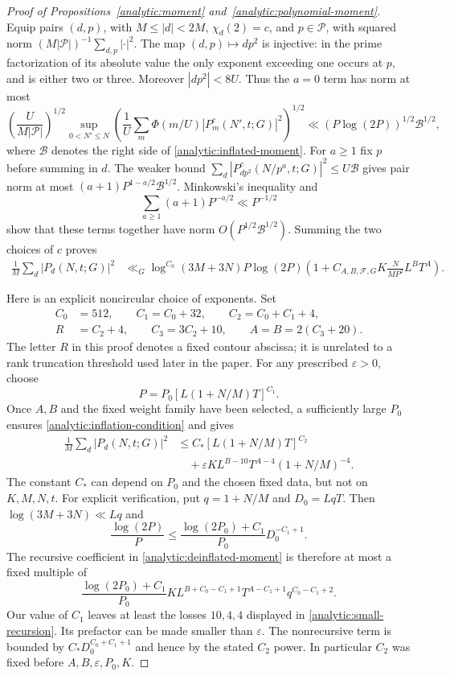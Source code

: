 \begin{proof}[Proof of Propositions~\ref{analytic:moment} and~\ref{analytic:polynomial-moment}]
Equip pairs $(d,p)$, with $M\leq|d|<2M$, $\chi_d(2)=c$, and
$p\in\mathcal P$, with squared norm
$(M|\mathcal P|)^{-1}\sum_{d,p}|\cdot|^2$.
The map $(d,p)\mapsto dp^2$ is injective: in the prime factorization
of its absolute value the only exponent exceeding one occurs at
$p$, and is either two or three. Moreover $|dp^2|<8U$.
Thus the $a=0$ term has norm at most
\[
 \left(\frac{U}{M|\mathcal P|}\right)^{1/2}
 \sup_{0<N'\leq N}
 \left(\frac1U\sum_m\Phi(m/U)|P_m^c(N',t;G)|^2\right)^{1/2}
 \ll(P\log(2P))^{1/2}\mathcal B^{1/2},
\]
where $\mathcal B$ denotes the right side of
\eqref{analytic:inflated-moment}.
For $a\geq1$ fix $p$ before summing in $d$. The weaker bound
$\sum_d|P_{dp^2}^c(N/p^a,t;G)|^2\leq U\mathcal B$ gives pair norm
at most
$(a+1)P^{1-a/2}\mathcal B^{1/2}$. Minkowski's inequality and
\[
 \sum_{a\geq1}(a+1)P^{-a/2}\ll P^{-1/2}
\]
show that these terms together have norm
$O(P^{1/2}\mathcal B^{1/2})$. Summing the two choices of $c$ proves
\begin{align}
 \frac1M\sum_d|P_d(N,t;G)|^2
 &\ll_G\log^{C_0}(3M+3N)P\log(2P)
 \left(1+C_{A,B,\mathcal F,G}K\frac{N}{MP^2}L^BT^A\right).
 \label{analytic:deinflated-moment}
\end{align}

Here is an explicit noncircular choice of exponents. Set
\begin{equation}\label{analytic:exponent-choices}
 \begin{split}
 C_0&=512,\qquad C_1=C_0+32,\qquad C_2=C_0+C_1+4,\\
 R&=C_2+4,\qquad C_3=3C_2+10,\qquad
 A=B=2(C_3+20).
 \end{split}
\end{equation}
The letter $R$ in this proof denotes a fixed contour abscissa; it is
unrelated to a rank truncation threshold used later in the paper.
For any prescribed $\varepsilon>0$, choose
\begin{equation}\label{analytic:choice-P}
 P=P_0[L(1+N/M)T]^{C_1}.
\end{equation}
Once $A,B$ and the fixed weight family have been selected, a sufficiently
large $P_0$ ensures \eqref{analytic:inflation-condition} and gives
\begin{align}
 \frac1M\sum_d|P_d(N,t;G)|^2
 &\leq C_*[L(1+N/M)T]^{C_2}
 \nonumber\\
 &\quad+\varepsilon K L^{B-10}T^{A-4}(1+N/M)^{-4}.
 \label{analytic:small-recursion}
\end{align}
The constant $C_*$ can depend on $P_0$ and the chosen fixed data, but
not on $K,M,N,t$.
For explicit verification, put $q=1+N/M$ and $D_0=LqT$.
Then $\log(3M+3N)\ll Lq$ and
\[
 \frac{\log(2P)}P
 \leq\frac{\log(2P_0)+C_1}{P_0}D_0^{-C_1+1}.
\]
The recursive coefficient in \eqref{analytic:deinflated-moment} is
therefore at most a fixed multiple of
\[
 \frac{\log(2P_0)+C_1}{P_0}
 K L^{B+C_0-C_1+1}T^{A-C_1+1}q^{C_0-C_1+2}.
\]
Our value of $C_1$ leaves at least the losses $10,4,4$ displayed in
\eqref{analytic:small-recursion}. Its prefactor can be made smaller
than $\varepsilon$. The nonrecursive term is bounded by
$C_*D_0^{C_0+C_1+1}$ and hence by the stated $C_2$ power. In
particular $C_2$ was fixed before $A,B,\varepsilon,P_0,K$.


\end{proof}
